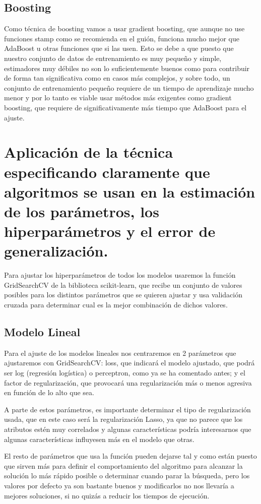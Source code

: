 \documentclass{article}
\begin{document}
	\subsection{Boosting}
	Como técnica de boosting vamos a usar gradient boosting, que aunque no use funciones stamp como se recomienda en el guión, funciona mucho mejor que AdaBoost u otras funciones que si las usen. Esto se debe a que puesto que nuestro conjunto de datos de entrenamiento es muy pequeño y simple, estimadores muy débiles no son lo suficientemente buenos como para contribuir de forma tan significativa como en casos más complejos, y sobre todo, un conjunto de entrenamiento pequeño requiere de un tiempo de aprendizaje mucho menor y por lo tanto es viable usar métodos más exigentes como gradient boosting, que requiere de significativamente más tiempo que AdaBoost para el ajuste. 
	\section{Aplicación de la técnica especificando claramente que algoritmos se usan en la estimación de los parámetros, los hiperparámetros y el error de generalización.} %
	Para ajustar los hiperparámetros de todos los modelos usaremos la función GridSearchCV de la biblioteca scikit-learn, que recibe un conjunto de valores posibles para los distintos parámetros que se quieren ajustar y usa validación cruzada para determinar cual es la mejor combinación de dichos valores.
	\subsection{Modelo Lineal}
	Para el ajuste de los modelos lineales nos centraremos en 2 parámetros que ajustaremos con GridSearchCV: loss, que indicará el modelo ajustado, que podrá ser log (regresión logística) o perceptron, como ya se ha comentado antes; y el factor de regularización, que provocará una regularización más o menos agresiva en función de lo alto que sea.
	\par 
	A parte de estos parámetros, es importante determinar el tipo de regularización usada, que en este caso será la regularización Lasso, ya que no parece que los atributos estén muy correlados y algunas características podría interesarnos que algunas características influyesen más en el modelo que otras.
	\par 
	El resto de parámetros que usa la función pueden dejarse tal y como están puesto que sirven más para definir el comportamiento del algoritmo para alcanzar la solución lo más rápido posible o determinar cuando parar la búsqueda, pero los valores por defecto ya son bastante buenos y modificarlos no nos llevaría a mejores soluciones, si no quizás a reducir los tiempos de ejecución. 
\end{document}
